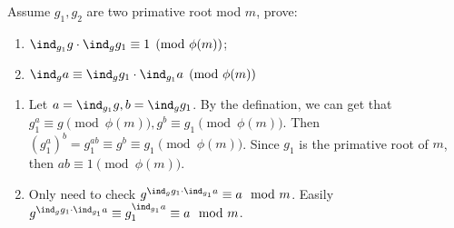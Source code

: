 \documentclass{ctexart}
\begin{document}
\begin{problem}\label{pro:5}
  Assume \(g_1,g_2\) are two primative root mod \(m\), prove:
  \begin{enumerate}
    \item \(\ind_{g_1}g \cdot \ind_{g}g_1 \equiv 1 \pmod{\phi(m)}\);
    \item \(\ind_g a \equiv \ind_g g_1 \cdot\ind_{g_1}a \pmod{\phi(m)}\)
  \end{enumerate}
\end{problem}
\begin{solution}
  \begin{enumerate}
    \item Let \(a=\ind_{g_1}g,b=\ind_{g}g_1\).
      By the defination, we can get that \(g_1^a \equiv g \pmod{\phi(m)}, g^b \equiv g_1 \pmod{\phi(m)}\).
      Then \((g_1^{a})^b = g_1^{ab}\equiv g^b \equiv g_1 \pmod{\phi(m)}\).
      Since \(g_1\) is the primative root of \(m\), then \(ab \equiv 1 \pmod{\phi(m)}\).
    \item Only need to check \(g^{\ind_g g_1 \cdot \ind_{g_1} a} \equiv a \mod m\).
      Easily \(g^{\ind_g g_1 \cdot \ind_{g_1} a} \equiv g_1^{\ind_{g_1} a}\equiv a \mod m \).
  \end{enumerate}
\end{solution}
\end{document}
